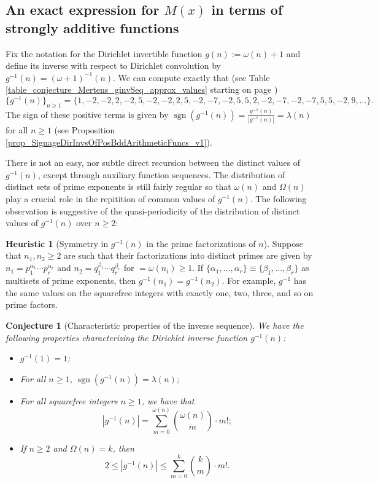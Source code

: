 \documentclass[11pt,reqno,a4letter]{article}
\numberwithin{figure}{section}
\numberwithin{table}{section}
\theoremstyle{plain}
\newtheorem{conjecture}[theorem]{Conjecture}
\numberwithin{theorem}{section}
\theoremstyle{definition}
\newtheorem{heuristic}[theorem]{Heuristic}
\newcommand{\NBRef}[1]{}
\begin{document}
\subsection{An exact expression for $M(x)$ in terms of strongly additive functions} 
\label{example_InvertingARecRelForMx_Intro}

Fix the notation for the Dirichlet invertible function $g(n) := \omega(n) + 1$ and define its 
inverse with respect to Dirichlet convolution by $g^{-1}(n) = (\omega+1)^{-1}(n)$. 
We can compute exactly that 
(see Table \ref{table_conjecture_Mertens_ginvSeq_approx_values} starting on page 
\pageref{table_conjecture_Mertens_ginvSeq_approx_values}) 
\[
\{g^{-1}(n)\}_{n \geq 1} = \{1, -2, -2, 2, -2, 5, -2, -2, 2, 5, -2, -7, -2, 5, 5, 2, -2, -7, -2, 
     -7, 5, 5, -2, 9, \ldots \}. 
\] 
The sign of these positive terms is given by 
$\operatorname{sgn}(g^{-1}(n)) = \frac{g^{-1}(n)}{|g^{-1}(n)|} = \lambda(n)$ for all $n \geq 1$ 
(see Proposition \ref{prop_SignageDirInvsOfPosBddArithmeticFuncs_v1}). 

There is not an easy, nor subtle 
direct recursion between the distinct values of $g^{-1}(n)$, except through auxiliary function sequences. 
The distribution of distinct sets of prime exponents is still fairly regular so that 
$\omega(n)$ and $\Omega(n)$ play a crucial role in the repitition of common values of 
$g^{-1}(n)$. 
The following observation is suggestive of the quasi-periodicity of the distribution of 
distinct values of $g^{-1}(n)$ over $n \geq 2$: 

\begin{heuristic}[Symmetry in $g^{-1}(n)$ in the prime factorizations of $n$] 
Suppose that $n_1, n_2 \geq 2$ are such that their factorizations into distinct primes are 
given by $n_1 = p_1^{\alpha_1} \cdots p_r^{\alpha_r}$ and $n_2 = q_1^{\beta_1} \cdots q_r^{\beta_r}$ 
for $ = \omega(n_i) \geq 1$. 
If $\{\alpha_1, \ldots, \alpha_r\} \equiv \{\beta_1, \ldots, \beta_r\}$ as multisets of prime exponents, 
then $g^{-1}(n_1) = g^{-1}(n_2)$. For example, $g^{-1}$ has the same values on the squarefree integers 
with exactly one, two, three, and so on prime factors.  
\end{heuristic} 

\NBRef{A01-2020-04-26}
\begin{conjecture}[Characteristic properties of the inverse sequence] 
\label{lemma_gInv_MxExample} 
We have the following properties characterizing the 
Dirichlet inverse function $g^{-1}(n)$: 
\begin{itemize} 

\item[\textbf{(A)}] $g^{-1}(1) = 1$; 
\item[\textbf{(B)}] For all $n \geq 1$, $\operatorname{sgn}(g^{-1}(n)) = \lambda(n)$; 
\item[\textbf{(C)}] For all squarefree integers $n \geq 1$, we have that 
     \[
     |g^{-1}(n)| = \sum_{m=0}^{\omega(n)} \binom{\omega(n)}{m} \cdot m!; 
     \]
\item[\textbf{(D)}] If $n \geq 2$ and $\Omega(n) = k$, then 
     \[
     2 \leq |g^{-1}(n)| \leq \sum_{m=0}^{k} \binom{k}{m} \cdot m!. 
     \]
\end{itemize} 
\end{conjecture} 
\end{document}

